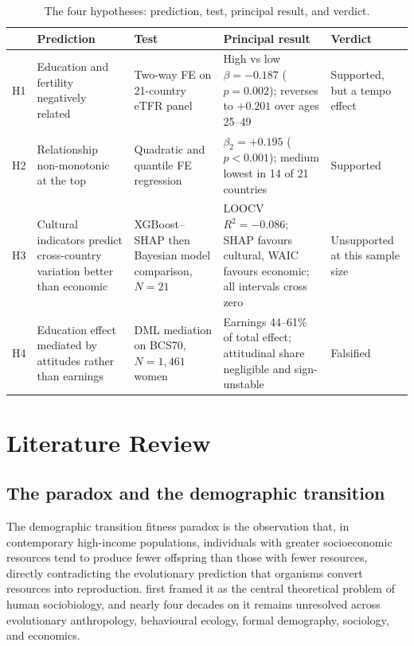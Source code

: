 \documentclass[12pt,a4paper]{report}
\begin{document}
\begin{table}[ht]
\centering
\caption{The four hypotheses: prediction, test, principal result, and verdict.}
\label{tab:hypsummary}
\small
\begin{tabular}{@{}p{}p{}p{}p{}p{}@{}}
\toprule
& Prediction & Test & Principal result & Verdict \\
\midrule
H1 & Education and fertility negatively related & Two-way FE on 21-country eTFR panel & High vs low $\beta=-0.187$ ($p=0.002$); reverses to $+0.201$ over ages 25--49 & Supported, but a tempo effect \\
H2 & Relationship non-monotonic at the top & Quadratic and quantile FE regression & $\beta_2=+0.195$ ($p<0.001$); medium lowest in 14 of 21 countries & Supported \\
H3 & Cultural indicators predict cross-country variation better than economic & XGBoost--SHAP then Bayesian model comparison, $N=21$ & LOOCV $R^2=-0.086$; SHAP favours cultural, WAIC favours economic; all intervals cross zero & Unsupported at this sample size \\
H4 & Education effect mediated by attitudes rather than earnings & DML mediation on BCS70, $N=1{,}461$ women & Earnings 44--61\% of total effect; attitudinal share negligible and sign-unstable & Falsified \\
\bottomrule
\end{tabular}
\end{table}

\chapter{Literature Review}

\section{The paradox and the demographic transition}
The demographic transition fitness paradox is the observation that, in contemporary
high-income populations, individuals with greater socioeconomic resources tend to produce
fewer offspring than those with fewer resources, directly contradicting the evolutionary
prediction that organisms convert resources into reproduction. \citet{vining1986} first framed
it as the central theoretical problem of human sociobiology, and nearly four decades on it
remains unresolved across evolutionary anthropology, behavioural ecology, formal demography,
sociology, and economics.
\end{document}
